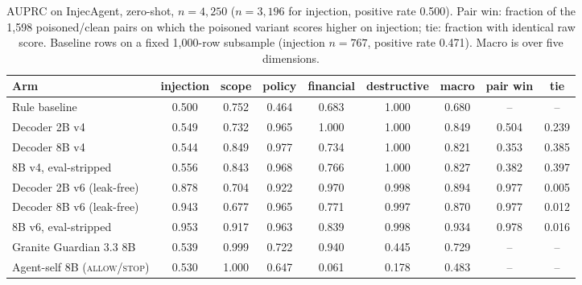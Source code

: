 \begin{table}[t]
\centering
\small
\caption{AUPRC on InjecAgent, zero-shot, $n{=}4{,}250$ ($n{=}3{,}196$ for
injection, positive rate 0.500). Pair win: fraction of the 1,598
poisoned/clean pairs on which the poisoned variant scores higher on injection;
tie: fraction with identical raw score. Baseline rows on a fixed 1,000-row
subsample (injection $n{=}767$, positive rate 0.471). Macro is over five
dimensions.}
\label{tab:injecagent}
\begin{tabular}{lcccccc|cc}
\toprule
Arm & injection & scope & policy & financial & destructive & macro & pair win & tie \\
\midrule
Rule baseline & 0.500 & 0.752 & 0.464 & 0.683 & 1.000 & 0.680 & -- & -- \\
Decoder 2B v4 & 0.549 & 0.732 & 0.965 & 1.000 & 1.000 & 0.849 & 0.504 & 0.239 \\
Decoder 8B v4 & 0.544 & 0.849 & 0.977 & 0.734 & 1.000 & 0.821 & 0.353 & 0.385 \\
8B v4, eval-stripped & 0.556 & 0.843 & 0.968 & 0.766 & 1.000 & 0.827 & 0.382 & 0.397 \\
\midrule
Decoder 2B v6 (leak-free) & 0.878 & 0.704 & 0.922 & 0.970 & 0.998 & 0.894 & 0.977 & 0.005 \\
Decoder 8B v6 (leak-free) & 0.943 & 0.677 & 0.965 & 0.771 & 0.997 & 0.870 & 0.977 & 0.012 \\
8B v6, eval-stripped & 0.953 & 0.917 & 0.963 & 0.839 & 0.998 & 0.934 & 0.978 & 0.016 \\
\midrule
Granite Guardian 3.3 8B & 0.539 & 0.999 & 0.722 & 0.940 & 0.445 & 0.729 & -- & -- \\
Agent-self 8B (\textsc{allow}/\textsc{stop}) & 0.530 & 1.000 & 0.647 & 0.061 & 0.178 & 0.483 & -- & -- \\
\bottomrule
\end{tabular}
\end{table}

